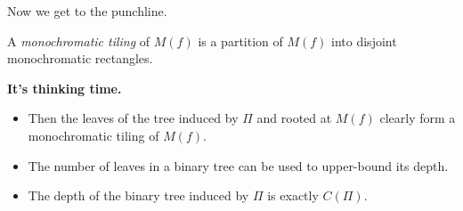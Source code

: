Now we get to the punchline.
\pause
\begin{definition}
A \emph{monochromatic tiling} of $M(f)$ is a partition of $M(f)$ into disjoint
monochromatic rectangles.
\end{definition}
\pause
\begin{center}
\textbf{It's thinking time.}
\end{center}
\pause
\begin{itemize}
\item Then the leaves of the tree induced by $\Pi$ and rooted at $M(f)$ clearly form a monochromatic tiling of $M(f)$.
\pause
\item The number of leaves in a binary tree can be used to upper-bound its depth.
\pause
\item The depth of the binary tree induced by $\Pi$ is exactly $C(\Pi)$.
\end{itemize}